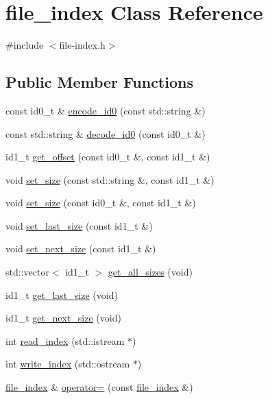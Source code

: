 \hypertarget{classfile__index}{\section{file\-\_\-index Class Reference}
\label{classfile__index}
}


{\ttfamily \#include $<$file-\/index.\-h$>$}

\subsection*{Public Member Functions}
\begin{DoxyCompactItemize}
\item 
const id0\-\_\-t \& \hyperlink{classfile__index_a9bc1769c562f2fc28956fb37326d4960}{encode\-\_\-id0} (const std\-::string \&)
\item 
const std\-::string \& \hyperlink{classfile__index_abbd1d70fee35330f0c3e6e1d7476e0fc}{decode\-\_\-id0} (const id0\-\_\-t \&)
\item 
id1\-\_\-t \hyperlink{classfile__index_a2ee314e1d2e8b081d58a320842790ed9}{get\-\_\-offset} (const id0\-\_\-t \&, const id1\-\_\-t \&)
\item 
void \hyperlink{classfile__index_a63aed225c5c30dafe1cfb347f29d3b9f}{set\-\_\-size} (const std\-::string \&, const id1\-\_\-t \&)
\item 
void \hyperlink{classfile__index_a2e49d051b8e4eb88df029440f10ee119}{set\-\_\-size} (const id0\-\_\-t \&, const id1\-\_\-t \&)
\item 
void \hyperlink{classfile__index_a25bd955b88e6d020b0841031d8ba3fb2}{set\-\_\-last\-\_\-size} (const id1\-\_\-t \&)
\item 
void \hyperlink{classfile__index_ac0dfe7cdf5127834b03cb02b01c89269}{set\-\_\-next\-\_\-size} (const id1\-\_\-t \&)
\item 
std\-::vector$<$ id1\-\_\-t $>$ \hyperlink{classfile__index_aff106a09e0c19c6bdeb0d000cf7f91bb}{get\-\_\-all\-\_\-sizes} (void)
\item 
id1\-\_\-t \hyperlink{classfile__index_aca45135b9a979671cfa005838be47c56}{get\-\_\-last\-\_\-size} (void)
\item 
id1\-\_\-t \hyperlink{classfile__index_adbb1af73e0f1797f7a71d2ec7817c695}{get\-\_\-next\-\_\-size} (void)
\item 
int \hyperlink{classfile__index_abb372d71f4ddc2a4e5be5f66105ae99d}{read\-\_\-index} (std\-::istream $\ast$)
\item 
int \hyperlink{classfile__index_aa41050f234a3adb88f108d834c7c5ec0}{write\-\_\-index} (std\-::ostream $\ast$)
\item 
\hyperlink{classfile__index}{file\-\_\-index} \& \hyperlink{classfile__index_a175bad8f17a4fc6285903d58d45ab5fd}{operator=} (const \hyperlink{classfile__index}{file\-\_\-index} \&)
\end{DoxyCompactItemize}
